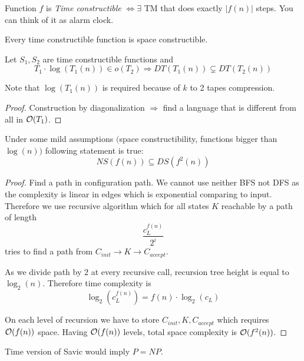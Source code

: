 \begin{definition}
	Function $f$ is \emph{Time constructible} $\iff \exists$ TM that does exactly $|f(n)|$ steps. You can think of it as alarm clock.
\end{definition}

\begin{observation}
	Every time constructible function is space constructible.
\end{observation}

\begin{theorem}\label{t_hier}
	Let $S_1, S_2$ are time constructible functions and
	\[ T_1 \cdot \log(T_1(n)) \in o(T_2) \Rightarrow DT(T_1(n)) \subsetneq DT(T_2(n)) \]

	Note that $\log(T_1(n))$ is required because of $k$ to 2 tapes compression.
\end{theorem}
\begin{proof}
	Construction by diagonalization $\Rightarrow$ find a language that is different from all in $\mathcal{O}(T_1)$.
\end{proof}

\begin{theorem}[Savic]\label{savic}
	Under some mild assumptions $($space constructibility, functions bigger than $\log(n))$ following statement is true:
	\[ NS(f(n)) \subseteq DS(f^2(n)) \]

\end{theorem}
\begin{proof}
	Find a path in configuration path. We cannot use neither BFS not DFS as the complexity is linear in edges which is exponential comparing to input.
	Therefore we use recursive algorithm which for all states $K$ reachable by a path of length
	\[ \frac{c_L^{f(n)}}{2^i}\]
	tries to find a path from $C_{init} \to K \to C_{accept}$.

	As we divide path by 2 at every recursive call, recursion tree height is equal to $\log_2(n)$.
	Therefore time complexity is
	\[ \log_2(c_L^{f(n)}) = f(n) \cdot \log_2(c_L) \]

	On each level of recursion we have to store $C_{init}, K, C_{accept}$ which requires $\mathcal{O}(f(n))$ space.
	Having $\mathcal{O}(f(n))$ levels, total space complexity is $\mathcal{O}(f^2(n))$.
\end{proof}

\begin{note}
	Time version of Savic would imply $P = NP$.
\end{note}

